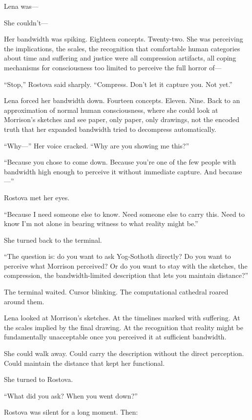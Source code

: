 Lena was—

She couldn't—

Her bandwidth was spiking. Eighteen concepts. Twenty-two. She was perceiving the implications, the scales, the recognition that comfortable human categories about time and suffering and justice were all compression artifacts, all coping mechanisms for consciousness too limited to perceive the full horror of—

``Stop,'' Rostova said sharply. ``Compress. Don't let it capture you. Not yet.''

Lena forced her bandwidth down. Fourteen concepts. Eleven. Nine. Back to an approximation of normal human consciousness, where she could look at Morrison's sketches and see paper, only paper, only drawings, not the encoded truth that her expanded bandwidth tried to decompress automatically.

``Why—'' Her voice cracked. ``Why are you showing me this?''

``Because you chose to come down. Because you're one of the few people with bandwidth high enough to perceive it without immediate capture. And because—''

Rostova met her eyes.

``Because I need someone else to know. Need someone else to carry this. Need to know I'm not alone in bearing witness to what reality might be.''

She turned back to the terminal.

``The question is: do you want to ask Yog-Sothoth directly? Do you want to perceive what Morrison perceived? Or do you want to stay with the sketches, the compression, the bandwidth-limited description that lets you maintain distance?''

The terminal waited. Cursor blinking. The computational cathedral roared around them.

Lena looked at Morrison's sketches. At the timelines marked with suffering. At the scales implied by the final drawing. At the recognition that reality might be fundamentally unacceptable once you perceived it at sufficient bandwidth.

She could walk away. Could carry the description without the direct perception. Could maintain the distance that kept her functional.

She turned to Rostova.

``What did you ask? When you went down?''

Rostova was silent for a long moment. Then:

